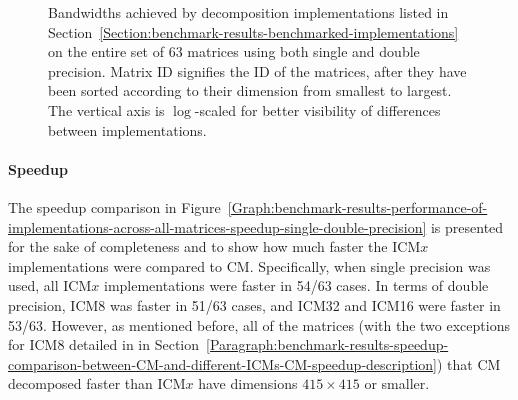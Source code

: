 \begin{figure}[h!]
\begin{subfigure}{\textwidth}
		\label{Graph:benchmark-results-performance-of-implementations-across-all-matrices-bandwidth-double-precision}
	\end{subfigure}
	\caption{Bandwidths achieved by decomposition implementations listed in Section~\ref{Section:benchmark-results-benchmarked-implementations} on the entire set of 63 matrices using both single and double precision. Matrix ID signifies the ID of the matrices, after they have been sorted according to their dimension from smallest to largest. The vertical axis is $ \log $-scaled for better visibility of differences between implementations.}
	\label{Graph:benchmark-results-performance-of-implementations-across-all-matrices-bandwidth-single-double-precision}
\end{figure}

\paragraph{Speedup} The speedup comparison in Figure~\ref{Graph:benchmark-results-performance-of-implementations-across-all-matrices-speedup-single-double-precision} is presented for the sake of completeness and to show how much faster the ICM$ x $ implementations were compared to CM. Specifically, when single precision was used, all ICM$ x $ implementations were faster in 54/63 cases. In terms of double precision, ICM8 was faster in 51/63 cases, and ICM32 and ICM16 were faster in 53/63. However, as mentioned before, all of the matrices (with the two exceptions for ICM8 detailed in \textit{} in Section~\ref{Paragraph:benchmark-results-speedup-comparison-between-CM-and-different-ICMs-CM-speedup-description}) that CM decomposed faster than ICM$ x $ have dimensions $ 415\times 415 $ or smaller.

